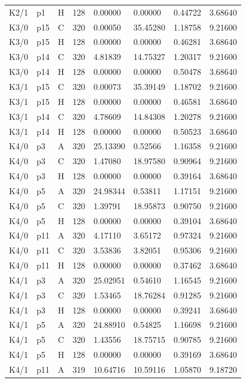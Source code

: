 \begin{longtable}{llllllll}
K2/1 & p1 & H & 128 & 0.00000 & 0.00000 & 0.44722 & 3.68640 \\
K3/0 & p15 & C & 320 & 0.00050 & 35.45280 & 1.18758 & 9.21600 \\
K3/0 & p15 & H & 128 & 0.00000 & 0.00000 & 0.46281 & 3.68640 \\
K3/0 & p14 & C & 320 & 4.81839 & 14.75327 & 1.20317 & 9.21600 \\
K3/0 & p14 & H & 128 & 0.00000 & 0.00000 & 0.50478 & 3.68640 \\
K3/1 & p15 & C & 320 & 0.00073 & 35.39149 & 1.18702 & 9.21600 \\
K3/1 & p15 & H & 128 & 0.00000 & 0.00000 & 0.46581 & 3.68640 \\
K3/1 & p14 & C & 320 & 4.78609 & 14.84308 & 1.20278 & 9.21600 \\
K3/1 & p14 & H & 128 & 0.00000 & 0.00000 & 0.50523 & 3.68640 \\
K4/0 & p3 & A & 320 & 25.13390 & 0.52566 & 1.16358 & 9.21600 \\
K4/0 & p3 & C & 320 & 1.47080 & 18.97580 & 0.90964 & 9.21600 \\
K4/0 & p3 & H & 128 & 0.00000 & 0.00000 & 0.39164 & 3.68640 \\
K4/0 & p5 & A & 320 & 24.98344 & 0.53811 & 1.17151 & 9.21600 \\
K4/0 & p5 & C & 320 & 1.39791 & 18.95873 & 0.90750 & 9.21600 \\
K4/0 & p5 & H & 128 & 0.00000 & 0.00000 & 0.39104 & 3.68640 \\
K4/0 & p11 & A & 320 & 4.17110 & 3.65172 & 0.97324 & 9.21600 \\
K4/0 & p11 & C & 320 & 3.53836 & 3.82051 & 0.95306 & 9.21600 \\
K4/0 & p11 & H & 128 & 0.00000 & 0.00000 & 0.37462 & 3.68640 \\
K4/1 & p3 & A & 320 & 25.02951 & 0.54610 & 1.16545 & 9.21600 \\
K4/1 & p3 & C & 320 & 1.53465 & 18.76284 & 0.91285 & 9.21600 \\
K4/1 & p3 & H & 128 & 0.00000 & 0.00000 & 0.39241 & 3.68640 \\
K4/1 & p5 & A & 320 & 24.88910 & 0.54825 & 1.16698 & 9.21600 \\
K4/1 & p5 & C & 320 & 1.43556 & 18.75715 & 0.90785 & 9.21600 \\
K4/1 & p5 & H & 128 & 0.00000 & 0.00000 & 0.39169 & 3.68640 \\
K4/1 & p11 & A & 319 & 10.64716 & 10.59116 & 1.05870 & 9.18720 \\

\end{longtable}
